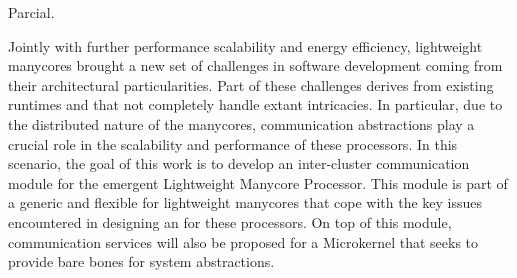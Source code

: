 
\begin{resumo}[english]

Parcial.

Jointly with further performance scalability and energy efficiency, lightweight manycores
brought a new set of challenges in software development coming from their architectural
particularities. Part of these challenges derives from existing runtimes and \oses that
not completely handle extant intricacies.
In particular, due to the distributed nature of the manycores, communication abstractions
play a crucial role in the scalability and performance of these processors.
In this scenario, the goal of this work is to develop an inter-cluster communication module
for the emergent \mppa Lightweight Manycore Processor.
This module is part of a generic and flexible \hal for lightweight manycores that cope with
the key issues encountered in designing an \os for these processors.
On top of this module, communication services will also be proposed for a Microkernel \os
that seeks to provide bare bones for system abstractions.

\end{resumo}